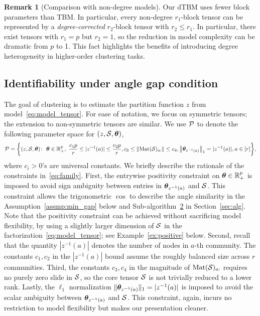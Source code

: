 \documentclass[lettersize,onecolumn,journal]{IEEEtran}
\theoremstyle{definition}
\theoremstyle{definition}
\newtheorem{rmk}{Remark}
\begin{document}
\begin{rmk}[Comparison with non-degree models]
Our dTBM uses fewer block parameters than TBM. In particular, every non-degree $r_1$-block tensor can be represented by a \emph{degree-corrected} $r_2$-block tensor with $r_2\leq r_1$. In particular, there exist tensors with $r_1=p$ but $r_2=1$, so the reduction in model complexity can be dramatic from $p$ to 1. This fact highlights the benefits of introducing degree heterogeneity in higher-order clustering tasks.
\end{rmk}


\subsection{Identifiability under angle gap condition}
The goal of clustering is to estimate the partition function $z$ from model~\eqref{eq:model_tensor}. For ease of notation, we focus on symmetric tensors; the extension to non-symmetric tensors are similar. We use $\mathcal{P}$ to denote the following parameter space for $(z,\mathcal{S},\boldsymbol{\theta})$,
\begin{align}\label{eq:family}
\tP=\bigg\{(z,\tS,\mtheta)\colon  \ \mtheta\in\mathbb{R}^p_{+},\ 
{c_1p\over r}\leq |z^{-1}(a)|\leq {c_2 p\over r}, c_3\leq \onormSize{}{\text{Mat}(\tS)_{a:}}\leq c_4, \onorm{\mtheta_{z^{-1}(a)}}_1=|z^{-1}(a)|, a\in[r]\bigg\},
\end{align}
\normalsize
where $c_i>0$'s are universal constants. We briefly describe the rationale of the constraints in~\eqref{eq:family}. 
First, the entrywise positivity constraint on  $\boldsymbol{\theta}\in\mathbb{R}^p_{+}$ is imposed to avoid sign ambiguity between entries in $\boldsymbol{\theta}_{z^{-1}(a)}$ and $\mathcal{S}$. This constraint allows the trigonometric $\cos$ to describe the angle similarity in the Assumption~\ref{assmp:min_gap} below and Sub-algorithm~\hyperref[alg:main]{2} in Section~\ref{sec:alg}. Note that the positivity constraint can be achieved without sacrificing model flexibility, by using a slightly larger dimension of $\mathcal{S}$ in the factorization~\eqref{eq:model_tensor}; see Example~\ref{ex:positive} below. Second, recall that the quantity $|z^{-1}(a)|$ denotes the number of nodes in $a$-th community. The constants $c_1, c_2$ in the $|z^{-1}(a)|$ bound assume the roughly balanced size across $r$ communities. Third, the constants $c_3, c_4 $ in the magnitude of $\text{Mat}(\mathcal{S})_{a:}$ requires no purely zero slide in $\mathcal{S}$, so the core tensor $\mathcal{S}$ is not trivially reduced to a lower rank. Lastly, the $\ell_1$ normalization $\lVert\boldsymbol{\theta}_{z^{-1}(a)}\rVert_1=|z^{-1}(a)|$ is imposed to avoid the scalar ambiguity between $\boldsymbol{\theta}_{z^{-1}(a)}$ and $\mathcal{S}$. This constraint, again, incurs no restriction to model flexibility but makes our presentation cleaner. 
\end{document}
